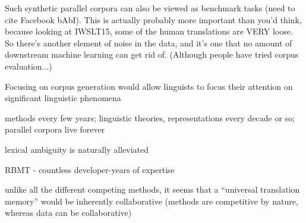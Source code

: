 Such synthetic parallel corpora can also be viewed as benchmark tasks (need to cite Facebook bAbI).
This is actually probably more important than you'd think, because looking at IWSLT15, some of the human translations are VERY loose.
So there's another element of noise in the data, and it's one that no amount of downstream machine learning can get rid of.
(Although people have tried corpus evaluation...)



Focusing on corpus generation would allow linguists to focus their attention on significant linguistic phenomena

methods every few years; linguistic theories, representations every decade or so; parallel corpora live forever

lexical ambiguity is naturally alleviated

RBMT - countless developer-years of expertise

unlike all the different competing methods, it seems that a ``universal translation memory'' would be inherently collaborative (methods are competitive by nature, whereas data can be collaborative)





